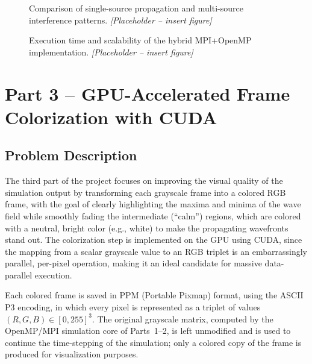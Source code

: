 \documentclass[10pt,twocolumn]{article}
\begin{document}
\begin{figure}[h]
\centering
\caption{Comparison of single-source propagation and multi-source interference patterns. \textit{[Placeholder -- insert figure]}}
\label{fig:part2-frames}
\end{figure}

\begin{figure}[h]
\centering
\caption{Execution time and scalability of the hybrid MPI+OpenMP implementation. \textit{[Placeholder -- insert figure]}}
\label{fig:part2-scaling}
\end{figure}

\section{Part 3 -- GPU-Accelerated Frame Colorization with CUDA}
\label{sec:cuda}

\subsection{Problem Description}
The third part of the project focuses on improving the visual quality of the simulation output
by transforming each grayscale frame into a colored RGB frame, with the goal of clearly
highlighting the maxima and minima of the wave field while smoothly fading the intermediate
(``calm'') regions, which are colored with a neutral, bright color (e.g., white) to make the
propagating wavefronts stand out. The colorization step is implemented on the GPU using CUDA,
since the mapping from a scalar grayscale value to an RGB triplet is an embarrassingly
parallel, per-pixel operation, making it an ideal candidate for massive data-parallel execution.

Each colored frame is saved in PPM (Portable Pixmap) format, using the ASCII P3 encoding, in
which every pixel is represented as a triplet of values $(R,G,B) \in [0,255]^3$. The original
grayscale matrix, computed by the OpenMP/MPI simulation core of Parts~1--2, is left unmodified
and is used to continue the time-stepping of the simulation; only a colored copy of the frame
is produced for visualization purposes.
\end{document}
